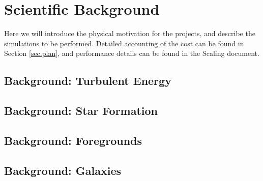 \section{Scientific Background}
\label{sec.background}

Here we will introduce the physical motivation for the projects, and describe
the simulations to be performed.  Detailed accounting of the cost 
can be found in Section \ref{sec.plan}, and performance details can be found in the
Scaling document.


\subsection{Background: Turbulent Energy}
\label{sec.back_turb}



\subsection{Background: Star Formation}
\label{sec.back_cores}



\subsection{Background: Foregrounds}
\label{sec.back_foregrounds}


\subsection{Background: Galaxies}
\label{sec.back_galaxies}


